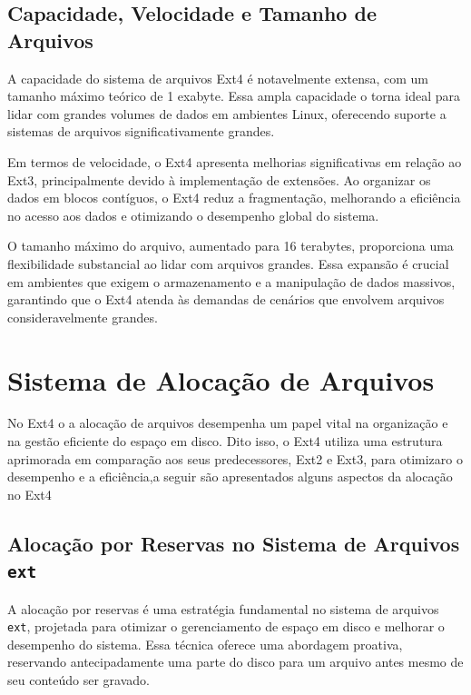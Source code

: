 \documentclass[
	12pt,				%
	openright,			%
	oneside,			%
	a4paper,			%
	chapter=TITLE,		%
	english,			%
	french,				%
	spanish,			%
	brazil				%
	]{abntex2}
\theoremstyle{definition}
\begin{document}
\section{Capacidade, Velocidade e Tamanho de Arquivos}
A capacidade do sistema de arquivos Ext4 é notavelmente extensa, com um tamanho máximo teórico de 1 exabyte. Essa 
ampla capacidade o torna ideal para lidar com grandes volumes de dados em ambientes Linux, oferecendo suporte a 
sistemas de arquivos significativamente grandes.

Em termos de velocidade, o Ext4 apresenta melhorias significativas em relação ao Ext3, principalmente devido 
à implementação de extensões. Ao organizar os dados em blocos contíguos, o Ext4 reduz a fragmentação, melhorando 
a eficiência no acesso aos dados e otimizando o desempenho global do sistema.

O tamanho máximo do arquivo, aumentado para 16 terabytes, proporciona uma flexibilidade substancial ao lidar 
com arquivos grandes. Essa expansão é crucial em ambientes que exigem o armazenamento e a manipulação de dados 
massivos, garantindo que o Ext4 atenda às demandas de cenários que envolvem arquivos consideravelmente grandes.


\chapter{Sistema de Alocação de Arquivos}
No Ext4 o a alocação de arquivos desempenha um papel vital na organização e na gestão eficiente do espaço em disco. 
Dito isso, o Ext4 utiliza uma estrutura aprimorada em comparação aos seus predecessores, Ext2 e Ext3, para otimizaro 
o desempenho e a eficiência,a seguir são apresentados alguns aspectos da alocação no Ext4


\section{Alocação por Reservas no Sistema de Arquivos \texttt{ext}}
A alocação por reservas é uma estratégia fundamental no sistema de arquivos \texttt{ext}, projetada para otimizar o gerenciamento de espaço em disco e melhorar o desempenho do sistema. Essa técnica oferece uma abordagem proativa, reservando antecipadamente uma parte do disco para um arquivo antes mesmo de seu conteúdo ser gravado.
\end{document}
